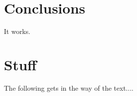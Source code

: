 \documentclass{ecsarticle}     %
\begin{document}
\section{Conclusions} \label{Section: Conclusions}
It works.
\backmatter


\appendix
\section{Stuff} \label{Section:Stuff}
The following gets in the way of the text....
\end{document}
